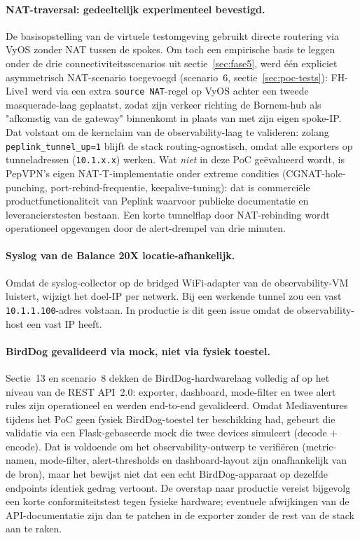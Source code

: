 \paragraph{NAT-traversal: gedeeltelijk experimenteel bevestigd.} De basisopstelling van de virtuele testomgeving gebruikt directe routering via VyOS zonder NAT tussen de spokes. Om toch een empirische basis te leggen onder de drie connectiviteitsscenarios uit sectie~\ref{sec:fase5}, werd één expliciet asymmetrisch NAT-scenario toegevoegd (scenario~6, sectie~\ref{sec:poc-tests}): FH-Live1 werd via een extra \texttt{source NAT}-regel op VyOS achter een tweede masquerade-laag geplaatst, zodat zijn verkeer richting de Bornem-hub als "afkomstig van de gateway" binnenkomt in plaats van met zijn eigen spoke-IP. Dat volstaat om de kernclaim van de observability-laag te valideren: zolang \texttt{peplink\_tunnel\_up=1} blijft de stack routing-agnostisch, omdat alle exporters op tunneladressen (\texttt{10.1.x.x}) werken. Wat \emph{niet} in deze PoC geëvalueerd wordt, is PepVPN's eigen NAT-T-implementatie onder extreme condities (CGNAT-hole-punching, port-rebind-frequentie, keepalive-tuning): dat is commerciële productfunctionaliteit van Peplink waarvoor publieke documentatie en leverancierstesten bestaan. Een korte tunnelflap door NAT-rebinding wordt operationeel opgevangen door de alert-drempel van drie minuten.

\paragraph{Syslog van de Balance 20X locatie-afhankelijk.} Omdat de syslog-collector op de bridged WiFi-adapter van de observability-VM luistert, wijzigt het doel-IP per netwerk. Bij een werkende tunnel zou een vast \texttt{10.1.1.100}-adres volstaan. In productie is dit geen issue omdat de observability-host een vast IP heeft.

\paragraph{BirdDog gevalideerd via mock, niet via fysiek toestel.} Sectie~13 en scenario~8 dekken de BirdDog-hardwarelaag volledig af op het niveau van de REST API~2.0: exporter, dashboard, mode-filter en twee alert rules zijn operationeel en werden end-to-end gevalideerd. Omdat Mediaventures tijdens het PoC geen fysiek BirdDog-toestel ter beschikking had, gebeurt die validatie via een Flask-gebaseerde mock die twee devices simuleert (decode + encode). Dat is voldoende om het observability-ontwerp te verifiëren (metric-namen, mode-filter, alert-thresholds en dashboard-layout zijn onafhankelijk van de bron), maar het bewijst niet dat een echt BirdDog-apparaat op dezelfde endpoints identiek gedrag vertoont. De overstap naar productie vereist bijgevolg een korte conformiteitstest tegen fysieke hardware; eventuele afwijkingen van de API-documentatie zijn dan te patchen in de exporter zonder de rest van de stack aan te raken.

